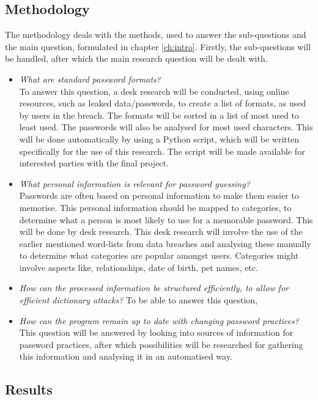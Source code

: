 \documentclass[a4paper,12pt]{article}
\begin{document}
\subsection{Methodology}
The methodology deals with the methods, used to answer the sub-questions and the main question, formulated in chapter \ref{ch:intro}. Firstly, the sub-questions will be handled, after which the main research question will be dealt with.

\begin{itemize}
\item \textit{What are standard password formats?}\\
  To answer this question, a desk research will be conducted, using online resources, such as leaked data/passwords, to create a list of formats, as used by users in the breach. The formats will be sorted in a list of most used to least used. The passwords will also be analysed for most used characters. This will be done automatically by using a Python script, which will be written specifically for the use of this research. The script will be made available for interested parties with the final project.
  
\item \textit{What personal information is relevant for password guessing?}\\
  Passwords are often based on personal information to make them easier to memorise. This personal information should be mapped to categories, to determine what a person is most likely to use for a memorable password. This will be done by desk research. This desk research will involve the use of the earlier mentioned word-lists from data breaches and analysing these manually to determine what categories are popular amongst users. Categories might involve aspects like, relationships, date of birth, pet names, etc.
  
\item \textit{How can the processed information be structured efficiently, to allow for efficient dictionary attacks?}
  To be able to answer this question, 

\item \textit{How can the program remain up to date with changing password practices?}
  This question will be answered by looking into sources of information for password practices, after which possibilities will be researched for gathering this information and analysing it in an automatised way.
\end{itemize}

\subsection{Results}
\end{document}
